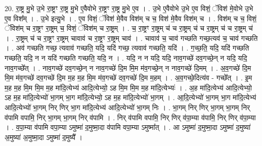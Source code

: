 \documentclass[17pt]{extarticle}
\begin{document}
20. रा॒ष्ट्र मु॒भे उ॒भे रा॒ष्ट्रꣳ रा॒ष्ट्र मु॒भे ए॒वैवोभे रा॒ष्ट्रꣳ रा॒ष्ट्र मु॒भे ए॒व । . उ॒भे ए॒वैवोभे उ॒भे ए॒व विशं॒ ॅविश॑ मे॒वोभे उ॒भे ए॒व विश᳚म् । . उ॒भे इत्यु॒भे । . ए॒व विशं॒ ॅविश॑ मे॒वैव विश॑म् च च॒ विश॑ मे॒वैव विश॑म् च । . विश॑म् च च॒ विशं॒ ॅविश॑म् च रा॒ष्ट्रꣳ रा॒ष्ट्रम् च॒ विशं॒ ॅविश॑म् च रा॒ष्ट्रम् । . च॒ रा॒ष्ट्रꣳ रा॒ष्ट्रम् च॑ च रा॒ष्ट्रम् च॑ च रा॒ष्ट्रम् च॑ च रा॒ष्ट्रम् च॑ । . रा॒ष्ट्रम् च॑ च रा॒ष्ट्रꣳ रा॒ष्ट्रम् चावाव॑ च रा॒ष्ट्रꣳ रा॒ष्ट्रम् चाव॑ । . चावाव॑ च॒ चाव॑ गच्छति गच्छ॒त्यव॑ च॒ चाव॑ गच्छति । . अव॑ गच्छति गच्छ॒ त्यवाव॑ गच्छति॒ यदि॒ यदि॑ गच्छ॒ त्यवाव॑ गच्छति॒ यदि॑ । . ग॒च्छ॒ति॒ यदि॒ यदि॑ गच्छति गच्छति॒ यदि॒ न न यदि॑ गच्छति गच्छति॒ यदि॒ न । . यदि॒ न न यदि॒ यदि॒ नाव॒गच्छे॑ दव॒गच्छे॒न् न यदि॒ यदि॒ नाव॒गच्छे᳚त् । . नाव॒गच्छे॑ दव॒गच्छे॒न् न नाव॒गच्छे॑ दि॒म मि॒म म॑व॒गच्छे॒न् न नाव॒गच्छे॑ दि॒मम् । . अ॒व॒गच्छे॑ दि॒म मि॒म म॑व॒गच्छे॑ दव॒गच्छे॑ दि॒म म॒ह म॒ह मि॒म म॑व॒गच्छे॑ दव॒गच्छे॑ दि॒म म॒हम् । . अ॒व॒गच्छे॒दित्य॑व - गच्छे᳚त् । . इ॒म म॒ह म॒ह मि॒म मि॒म म॒ह मा॑दि॒त्येभ्य॑ आदि॒त्येभ्यो॒ ऽह मि॒म मि॒म म॒ह मा॑दि॒त्येभ्यः॑ । . अ॒ह मा॑दि॒त्येभ्य॑ आदि॒त्येभ्यो॒ ऽह म॒ह मा॑दि॒त्येभ्यो॑ भा॒गम् भा॒ग मा॑दि॒त्येभ्यो॒ ऽह म॒ह मा॑दि॒त्येभ्यो॑ भा॒गम् । . आ॒दि॒त्येभ्यो॑ भा॒गम् भा॒ग मा॑दि॒त्येभ्य॑ आदि॒त्येभ्यो॑ भा॒गम् निर् णिर् भा॒ग मा॑दि॒त्येभ्य॑ आदि॒त्येभ्यो॑ भा॒गम् निः । . भा॒गम् निर् णिर् भा॒गम् भा॒गम् निर् व॑पामि वपामि॒ निर् भा॒गम् भा॒गम् निर् व॑पामि । . निर् व॑पामि वपामि॒ निर् णिर् व॑पा॒म्या व॑पामि॒ निर् णिर् व॑पा॒म्या । . व॒पा॒म्या व॑पामि वपा॒म्या ऽमुष्मा॑ द॒मुष्मा॒दा व॑पामि वपा॒म्या ऽमुष्मा᳚त् । . आ ऽमुष्मा॑ द॒मुष्मा॒दा ऽमुष्मा॑ द॒मुष्या॑ अ॒मुष्या॑ अ॒मुष्मा॒दा ऽमुष्मा॑ द॒मुष्यै᳚ । \newline
\end{document}
